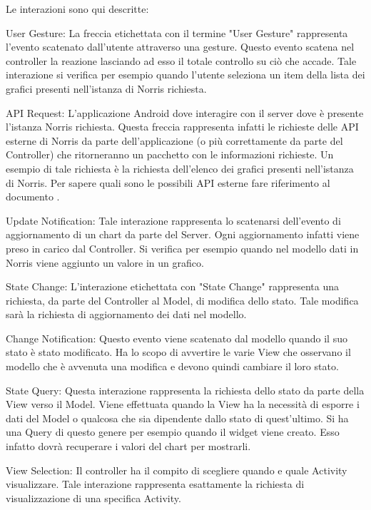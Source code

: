     	Le interazioni sono qui descritte:
    	\begin{description}
	    	\item{User Gesture:}
	    		La freccia etichettata con il termine "User Gesture" rappresenta l'evento scatenato dall'utente attraverso una gesture. Questo evento scatena nel controller la reazione lasciando ad esso il totale controllo su ciò che accade. Tale interazione si verifica per esempio quando l'utente seleziona un item della lista dei grafici presenti nell'istanza di Norris richiesta.
	    	\item{API Request:}
	    		L'applicazione Android dove interagire con il server dove è presente l'istanza Norris richiesta. Questa freccia rappresenta infatti le richieste delle API esterne di Norris da parte dell'applicazione (o più correttamente da parte del Controller) che ritorneranno un pacchetto con le informazioni richieste. Un esempio di tale richiesta è la richiesta dell'elenco dei grafici presenti nell'istanza di Norris. Per sapere quali sono le possibili API esterne fare riferimento al documento .
	    	\item{Update Notification:}
	    		Tale interazione rappresenta lo scatenarsi dell'evento di aggiornamento di un chart da parte del Server. Ogni aggiornamento infatti viene preso in carico dal Controller. Si verifica per esempio quando nel modello dati in Norris viene aggiunto un valore in un grafico.
	    	\item{State Change:}
	    		L'interazione etichettata con "State Change" rappresenta una richiesta, da parte del Controller al Model, di modifica dello stato. Tale modifica sarà la richiesta di aggiornamento dei dati nel modello.
	    	\item{Change Notification:}
	    		Questo evento viene scatenato dal modello quando il suo stato è stato modificato. Ha lo scopo di avvertire le varie View che osservano il modello che è avvenuta una modifica e devono quindi cambiare il loro stato.
	    	\item{State Query:}
	    		Questa interazione rappresenta la richiesta dello stato da parte della View verso il Model. Viene effettuata quando la View ha la necessità di esporre i dati del Model o qualcosa che sia dipendente dallo stato di quest'ultimo. Si ha una Query di questo genere per esempio quando il widget viene creato. Esso infatto dovrà recuperare i valori del chart per mostrarli.
	    	\item{View Selection:}
	    		Il controller ha il compito di scegliere quando e quale Activity visualizzare. Tale interazione rappresenta esattamente la richiesta di visualizzazione di una specifica Activity.
	    \end{description}



